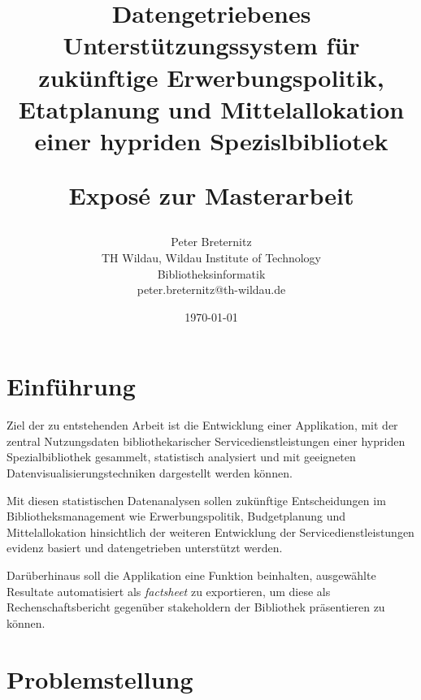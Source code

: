 \documentclass[10pt,a4paper,twocolumn,conference]{IEEEtran}
\begin{document}
\nocite{*}
\title{{\bf Datengetriebenes Unterstützungssystem für zukünftige
        Erwerbungspolitik, Etatplanung und Mittelallokation einer hypriden
        Spezislbibliotek} \\ 
    \begin{large}
        Exposé zur Masterarbeit                                                                             
    \end{large}}
\author{
	Peter Breternitz \\
	TH Wildau, Wildau Institute of Technology\\ Bibliotheksinformatik \\
	peter.breternitz@th-wildau.de
}


\date{\today}

\maketitle

\section{Einführung}
Ziel der zu entstehenden Arbeit ist die Entwicklung einer Applikation,
mit der zentral Nutzungsdaten bibliothekarischer Servicedienstleistungen einer
hypriden Spezialbibliothek gesammelt, statistisch
analysiert und mit geeigneten Datenvisualisierungstechniken dargestellt werden können. 

Mit diesen statistischen Datenanalysen sollen zukünftige
Entscheidungen im Bibliotheksmanagement wie Erwerbungspolitik, Budgetplanung und 
Mittelallokation hinsichtlich der weiteren Entwicklung der 
Servicedienstleistungen evidenz basiert und datengetrieben unterstützt werden. 

Darüberhinaus soll die Applikation eine Funktion beinhalten, ausgewählte
Resultate automatisiert als \textit{factsheet} zu exportieren, um diese 
als Rechenschaftsbericht gegenüber stakeholdern der Bibliothek präsentieren zu
können.


\section{Problemstellung}
\blindtext
\end{document}
